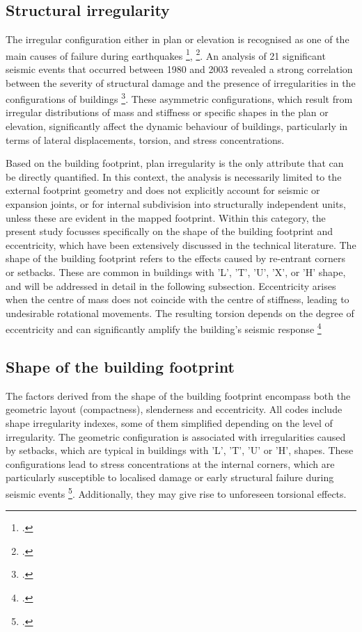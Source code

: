 \begin{refsection}
\subsection{Structural irregularity} %
The irregular configuration either in plan or elevation is recognised as one of the main causes of failure during earthquakes \footcite{brzev_gem_2013}, \footcite{naveen_analysis_2019}. An analysis of 21 significant seismic events that occurred between 1980 and 2003 revealed a strong correlation between the severity of structural damage and the presence of irregularities in the configurations of buildings \footcite{raul_gonzalez_herrera_influence_2008}.  These asymmetric configurations, which result from irregular distributions of mass and stiffness or specific shapes in the plan or elevation, significantly affect the dynamic behaviour of buildings, particularly in terms of lateral displacements, torsion, and stress concentrations.

Based on the building footprint, plan irregularity is the only attribute that can be directly quantified. In this context, the analysis is necessarily limited to the external footprint geometry and does not explicitly account for seismic or expansion joints, or for internal subdivision into structurally independent units, unless these are evident in the mapped footprint.
Within this category, the present study focusses specifically on the shape of the building footprint and eccentricity, which have been extensively discussed in the technical literature. The shape of the building footprint refers to the effects caused by re-entrant corners or setbacks. These are common in buildings with 'L', 'T', 'U', 'X', or 'H' shape, and will be addressed in detail in the following subsection. Eccentricity arises when the centre of mass does not coincide with the centre of stiffness, leading to undesirable rotational movements. The resulting torsion depends on the degree of eccentricity and can significantly amplify the building’s seismic response \footcite{gokdemir_effects_2013}

\subsection{Shape of the building footprint} %

The factors derived from the shape of the building footprint encompass both the geometric layout (compactness), slenderness and eccentricity. All codes include shape irregularity indexes, some of them simplified depending on the level of irregularity.  The geometric configuration is associated with irregularities caused by setbacks, which are typical in buildings with 'L', 'T', 'U' or 'H', shapes. These configurations lead to stress concentrations at the internal corners, which are particularly susceptible to localised damage or early structural failure during seismic events \footcite{naveen_analysis_2019}. Additionally, they may give rise to unforeseen torsional effects.


\end{refsection}
